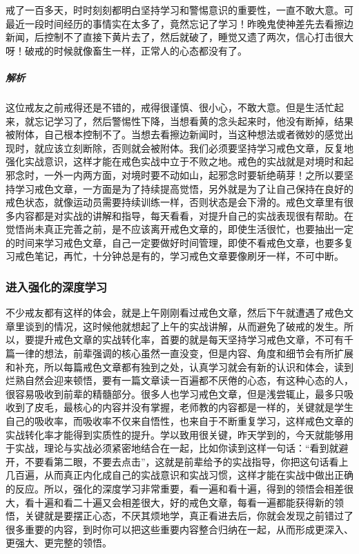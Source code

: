 \begin{case}
    戒了一百多天，时时刻刻都明白坚持学习和警惕意识的重要性，一直不敢大意。可最近一段时间经历的事情实在太多了，竟然忘记了学习！昨晚鬼使神差先去看擦边新闻，后控制不了直接下黄片去了，然后就破了，睡觉又遗了两次，信心打击很大呀！破戒的时候就像畜生一样，正常人的心态都没有了。
    \subparagraph{解析} 这位戒友之前戒得还是不错的，戒得很谨慎、很小心，不敢大意。但是生活忙起来，就忘记学习了，然后警惕性下降，当想看黄的念头起来时，他没有断掉，结果被附体，自己根本控制不了。当想去看擦边新闻时，当这种想法或者微妙的感觉出现时，就应该立刻断除，否则就会被附体。我们必须要坚持学习戒色文章，反复地强化实战意识，这样才能在戒色实战中立于不败之地。戒色的实战就是对境时和起邪念时，一外一内两方面，对境时要不动如山，起邪念时要斩绝萌芽！之所以要坚持学习戒色文章，一方面是为了持续提高觉悟，另外就是为了让自己保持在良好的戒色状态，就像运动员需要持续训练一样，否则状态是会下滑的。戒色文章里有很多内容都是对实战的讲解和指导，每天看看，对提升自己的实战表现很有帮助。在觉悟尚未真正完善之前，是不应该离开戒色文章的，即使生活很忙，也要抽出一定的时间来学习戒色文章，自己一定要做好时间管理，即使不看戒色文章，也要多复习戒色笔记，再忙，十分钟总是有的，学习戒色文章要像刷牙一样，不可中断。
\end{case}

\subsubsection{进入强化的深度学习}

不少戒友都有这样的体会，就是上午刚刚看过戒色文章，然后下午就遭遇了戒色文章里谈到的情况，这时候他就想起了上午的实战讲解，从而避免了破戒的发生。所以，要提升戒色文章的实战转化率，首要的就是每天坚持学习戒色文章，不可有千篇一律的想法，前辈强调的核心虽然一直没变，但是内容、角度和细节会有所扩展和补充，所以每篇戒色文章都有独到之处，认真学习就会有新的认识和体会，读到烂熟自然会迎来顿悟，要有一篇文章读一百遍都不厌倦的心态，有这种心态的人，很容易吸收到前辈的精髓部分。很多人也学习戒色文章，但是浅尝辄止，最多只吸收到了皮毛，最核心的内容并没有掌握，老师教的内容都是一样的，关键就是学生自己的吸收率，而吸收率不仅来自悟性，也来自于不断重复学习，这样戒色文章的实战转化率才能得到实质性的提升。学以致用很关键，昨天学到的，今天就能够用于实战，理论与实战必须紧密地结合在一起，比如你读到这样一句话：“看到就避开，不要看第二眼，不要去点击”，这就是前辈给予的实战指导，你把这句话看上几百遍，从而真正内化成自己的实战意识和实战习惯，这样才能在实战中做出正确的反应。所以，强化的深度学习非常重要，看一遍和看十遍，得到的领悟会相差很大，看十遍和看二十遍又会相差很大，好的戒色文章，每看一遍都能获得新的领悟，关键就是要摆正心态，不厌其烦地学，真正看进去后，你就会发现之前错过了很多重要的内容，到时你可以把这些重要内容整合归纳在一起，从而形成更深入、更强大、更完整的领悟。


